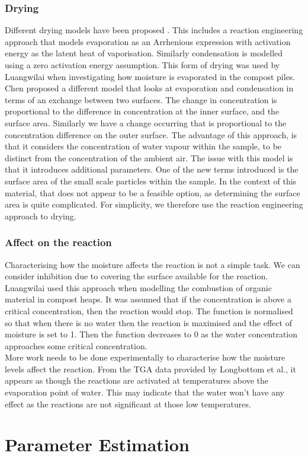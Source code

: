 \subsubsection{Drying}
Different drying models have been proposed \cite{chen98}. This includes a reaction engineering approach that models evaporation as an Arrhenious expression with activation energy as the latent heat of vaporisation. Similarly condensation is modelled using a zero activation energy assumption. This form of drying was used by Luangwilai \cite{luang11} when investigating how moisture is evaporated in the compost piles.\\
Chen \cite{chen98} proposed a different model that looks at evaporation and condensation in terms of an exchange between two surfaces. The change in concentration is proportional to the difference in concentration at the inner surface, and the surface area. Similarly we have a change occurring that is proportional to the concentration difference on the outer surface. The advantage of this approach, is that it considers the concentration of water vapour within the sample, to be distinct from the concentration of the ambient air. The issue with this model is that it introduces additional parameters. One of the new terms introduced is the surface area of the small scale particles within the sample. In the context of this material, that does not appear to be a feasible option, as determining the surface area is quite complicated. For simplicity, we therefore use the reaction engineering approach to drying.

\subsubsection{Affect on the reaction}
Characterising how the moisture affects the reaction is not a simple task. We can consider inhibition due to covering the surface available for the reaction. Luangwilai \cite{luang11} used this approach when modelling the combustion of organic material in compost heaps. It was assumed that if the concentration is above a critical concentration, then the reaction would stop. The function is normalised so that when there is no water then the reaction is maximised and the effect of moisture is set to 1. Then the function decreases to 0 as the water concentration approaches some critical concentration. \\
More work needs to be done experimentally to characterise how the moisture levels affect the reaction. From the TGA data provided by Longbottom et al.\cite{Ray19}, it appears as though the reactions are activated at temperatures above the evaporation point of water. This may indicate that the water won't have any effect as the reactions are not significant at those low temperatures.

\section{Parameter Estimation}
\begin{itemize}

\end{itemize}

